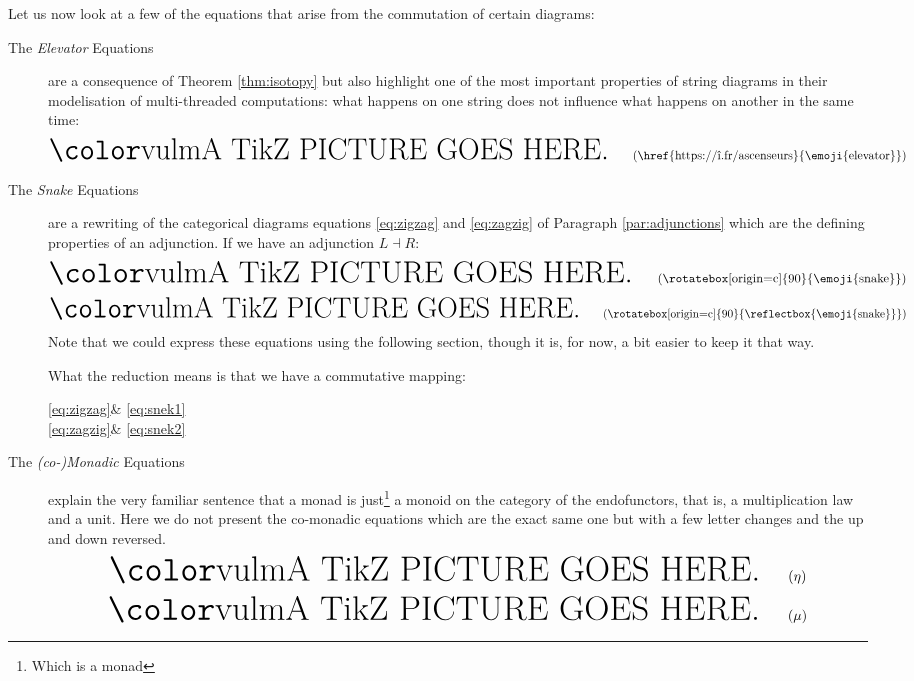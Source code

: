 \documentclass[math, english, info]{cours}
\begin{document}
Let us now look at a few of the equations that arise from the commutation of certain diagrams:
\begin{description}
	\item[The \emph{Elevator} Equations] are a consequence of Theorem \ref{thm:isotopy} but also highlight one of the most important properties of string diagrams in their modelisation of multi-threaded computations: what happens on one string does not influence what happens on another in the same time:
	      \begin{equation}
		      \inputtikz{sd-elevator}
		      \label{eq:elevator}
		      \tag{\href{https://î.fr/ascenseurs}{\emoji{elevator}}}
	      \end{equation}

	\item[The \emph{Snake} Equations] are a rewriting of the categorical diagrams equations \eqref{eq:zigzag} and \eqref{eq:zagzig} of Paragraph \ref{par:adjunctions} which are the defining properties of an adjunction.
	      If we have an adjunction $L\dashv R$:
	      \begin{equation}
		      \inputtikz{sd-snake1}
		      \tag{\rotatebox[origin=c]{90}{\emoji{snake}}}
		      \label{eq:snek1}
	      \end{equation}
	      \vspace{-12pt}
	      \begin{equation}
		      \inputtikz{sd-snake2}
		      \tag{\rotatebox[origin=c]{90}{\reflectbox{\emoji{snake}}}}
		      \label{eq:snek2}
	      \end{equation}
	      Note that we could express these equations using the following section, though it is, for now, a bit easier to keep it that way.

	      What the reduction means is that we have a commutative mapping:
	      \begin{category}[]
		      \eqref{eq:zigzag}  & \eqref{eq:snek1}  \\
		      \eqref{eq:zagzig} & \eqref{eq:snek2}
	      \end{category}
	\item[The \emph{(co-)Monadic} Equations] explain the very familiar sentence that a monad is just\footnote{Which is a monad} a monoid on the category of the endofunctors, that is, a multiplication law and a unit.
	      Here we do not present the co-monadic equations which are the exact same one but with a few letter changes and the up and down reversed.
	      \begin{equation}
		      \inputtikz{sd-monad-unit}
		      \label{eq:unitax}
		      \tag{$\eta$}
	      \end{equation}
	      \begin{equation}
		      \inputtikz{sd-monad-mult}
		      \label{eq:muax}
		      \tag{$\mu$}
	      \end{equation}
\end{description}
\end{document}
